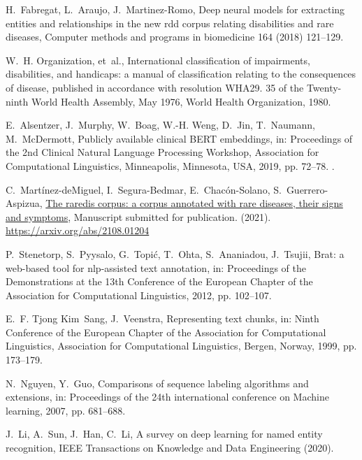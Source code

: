 \documentclass[preprint,12pt]{elsarticle}
\begin{document}
\begin{thebibliography}{10}
H.~Fabregat, L.~Araujo, J.~Martinez-Romo, Deep neural models for extracting
  entities and relationships in the new rdd corpus relating disabilities and
  rare diseases, Computer methods and programs in biomedicine 164 (2018)
  121--129.

W.~H. Organization, et~al., International classification of impairments,
  disabilities, and handicaps: a manual of classification relating to the
  consequences of disease, published in accordance with resolution WHA29. 35 of
  the Twenty-ninth World Health Assembly, May 1976, World Health Organization,
  1980.

E.~Alsentzer, J.~Murphy, W.~Boag, W.-H. Weng, D.~Jin, T.~Naumann, M.~McDermott,
  Publicly available clinical {BERT} embeddings, in: Proceedings of the 2nd
  Clinical Natural Language Processing Workshop, Association for Computational
  Linguistics, Minneapolis, Minnesota, USA, 2019, pp. 72--78.
\newblock \href {https://doi.org/10.18653/v1/W19-1909}
  {}.

C.~Martínez-deMiguel, I.~Segura-Bedmar, E.~Chacón-Solano,
  S.~Guerrero-Aspizua, \href{https://arxiv.org/abs/2108.01204}{The raredis
  corpus: a corpus annotated with rare diseases, their signs and symptoms},
  Manuscript submitted for publication. (2021).
\newline\urlprefix\url{https://arxiv.org/abs/2108.01204}

P.~Stenetorp, S.~Pyysalo, G.~Topi{\'c}, T.~Ohta, S.~Ananiadou, J.~Tsujii, Brat:
  a web-based tool for nlp-assisted text annotation, in: Proceedings of the
  Demonstrations at the 13th Conference of the European Chapter of the
  Association for Computational Linguistics, 2012, pp. 102--107.

E.~F. Tjong Kim~Sang, J.~Veenstra, Representing text chunks, in: Ninth
  Conference of the {E}uropean Chapter of the Association for Computational
  Linguistics, Association for Computational Linguistics, Bergen, Norway, 1999,
  pp. 173--179.

N.~Nguyen, Y.~Guo, Comparisons of sequence labeling algorithms and extensions,
  in: Proceedings of the 24th international conference on Machine learning,
  2007, pp. 681--688.

J.~Li, A.~Sun, J.~Han, C.~Li, A survey on deep learning for named entity
  recognition, IEEE Transactions on Knowledge and Data Engineering (2020).


\end{thebibliography}
\end{document}
